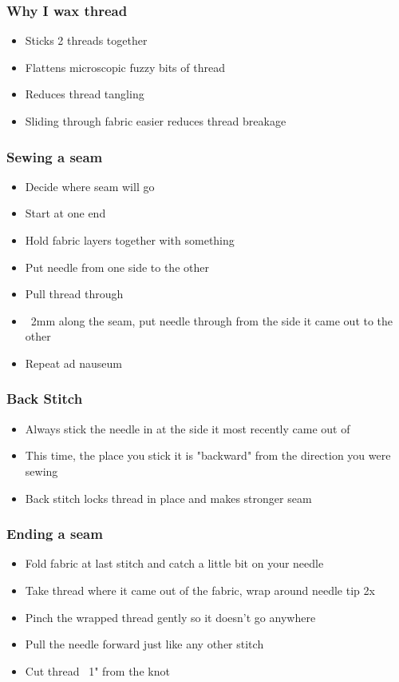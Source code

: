\documentclass{beamer}
\begin{document}
\begin{frame}[fragile]
\frametitle{Why I wax thread}
\begin{itemize}[<+(1)->]
\item Sticks 2 threads together
\item Flattens microscopic fuzzy bits of thread
\item Reduces thread tangling
\item Sliding through fabric easier reduces thread breakage
\end{itemize}
\end{frame}

\begin{frame}[fragile]
\frametitle{Sewing a seam}
\begin{itemize}[<+(1)->]
\item Decide where seam will go
\item Start at one end
\item Hold fabric layers together with something
\item Put needle from one side to the other
\item Pull thread through
\item ~2mm along the seam, put needle through from the side it came out to the other
\item Repeat ad nauseum
\end{itemize}
\end{frame}

\begin{frame}[fragile]
\frametitle{Back Stitch}
\begin{itemize}[<+(1)->]
\item Always stick the needle in at the side it most recently came out of
\item This time, the place you stick it is "backward" from the direction you were sewing
\item Back stitch locks thread in place and makes stronger seam
\end{itemize}
\end{frame}

\begin{frame}[fragile]
\frametitle{Ending a seam}
\begin{itemize}[<+(1)->]
\item Fold fabric at last stitch and catch a little bit on your needle
\item Take thread where it came out of the fabric, wrap around needle tip 2x
\item Pinch the wrapped thread gently so it doesn't go anywhere
\item Pull the needle forward just like any other stitch
\item Cut thread ~1" from the knot
\end{itemize}
\end{frame}
\end{document}
